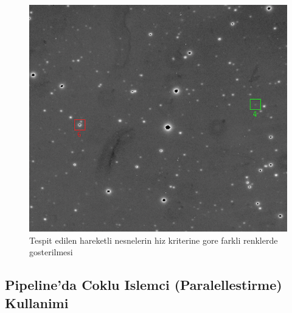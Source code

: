 \documentclass[review]{elsarticle}
\begin{document}
\begin{figure}[!t]
  \centering
  \includegraphics[scale=0.50]{visual}
  \caption{Tespit edilen hareketli nesnelerin hiz kriterine gore farkli renklerde gosterilmesi}
  \label{fig:visual}
\end{figure}

\subsection{Pipeline'da Coklu Islemci (Paralellestirme) Kullanimi}
\end{document}

